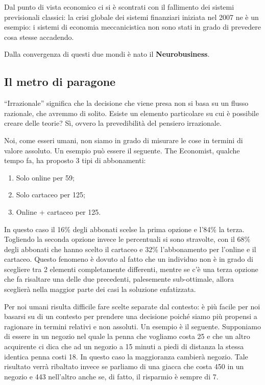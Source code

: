 Dal punto di vista economico ci si è scontrati con il fallimento dei sistemi
previsionali classici: la crisi globale dei sistemi finanziari iniziata nel
2007 ne è un esempio: i sistemi di economia meccanicistica non sono stati in
grado di prevedere cosa stesse accadendo.

Dalla convergenza di questi due mondi è nato il \textbf{Neurobusiness}.

\subsection{Il metro di paragone}

``Irrazionale'' significa che la decisione che viene presa non si basa su un
flusso razionale, che avremmo di solito. Esiste un elemento particolare su cui
è possibile creare delle teorie? Sì, ovvero la prevedibilità del pensiero
irrazionale.

Noi, come esseri umani, non siamo in grado di misurare le cose in termini di
valore assoluto.
Un esempio può essere il seguente. The Economist, qualche tempo fa, ha 
proposto 3 tipi di abbonamenti:
\begin{enumerate}
 \item Solo online per 59\textdollar{};
 \item Solo cartaceo per 125\textdollar{};
 \item Online + cartaceo per 125\textdollar{}.
\end{enumerate}
In questo caso il 16\% degli abbonati scelse la prima opzione e l'84\% la terza.
Togliendo la seconda opzione invece le percentuali si sono stravolte, con il
68\% degli abbonati che hanno scelto il cartaceo e 32\% l'abbonamento per
l'online e il cartaceo. 
Questo fenomeno è dovuto al fatto che un individuo non è in grado di scegliere
tra 2 elementi completamente differenti, mentre se c'è una terza opzione che fa
risaltare una delle due precedenti, palesemente sub-ottimale, allora sceglierà
nella maggior parte dei casi la soluzione enfatizzata.

Per noi umani risulta difficile fare scelte separate dal contesto: è più
facile per noi basarsi su di un contesto per prendere una decisione poiché
siamo più propensi a ragionare in termini relativi e non assoluti.
Un esempio è il seguente. Supponiamo di essere in un negozio nel quale
la penna che vogliamo costa 25\textdollar{} e che un altro acquirente ci dica
che ad un negozio a 15 minuti a piedi di distanza la stessa identica penna
costi 18\textdollar{}. In questo caso la maggioranza cambierà negozio. Tale
risultato verrà ribaltato invece se parliamo di una giacca che costa
450\textdollar{} in un negozio e 443\textdollar{} nell'altro anche se, di
fatto, il risparmio è sempre di 7\textdollar{}.

